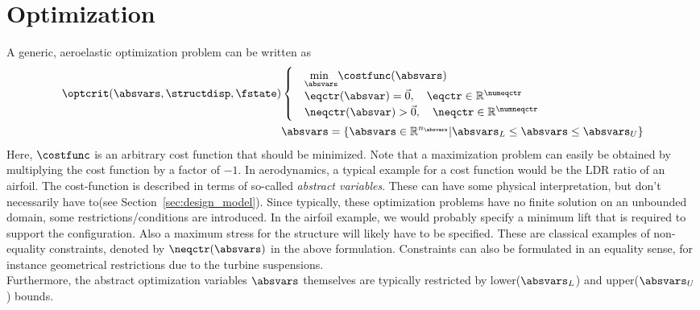 \documentclass[../main.tex]{subfiles}
\begin{document}
\setlength{\delimitershortfall}{0pt}
\section{Optimization}\label{sec:optimization}




A generic, aeroelastic optimization problem can be written as
\begin{align}
\optcrit(\absvars,\structdisp,\fstate)
&\begin{cases}
&\underset{\absvars}{\text{min }}\costfunc(\absvars) \\%
&\eqctr(\absvar)=\vec{0},~~~\eqctr \in \mathbb{R}^{\numeqctr} \\
&\neqctr(\absvar)>\vec{0},~~~\neqctr \in \mathbb{R}^{\numneqctr} \\
\end{cases} \label{eq:generic_optimization_problem_1}\\
&\absvars = \{ \absvars \in \mathbb{R}^{n_{\absvars}} | \absvars_L \leq \absvars \leq \absvars_U \}\label{eq:generic_optimization_problem_2}
\end{align}
Here,  $\costfunc$ is an arbitrary cost function that should be minimized. Note that a maximization problem can easily be obtained by multiplying the cost function by a factor of $-1$. In aerodynamics, a typical example for a cost function would be the \ac{LDR} ratio of an airfoil. The cost-function is described in terms of so-called \textit{abstract variables}. These can have some physical interpretation, but don't necessarily have to(see Section~\ref{sec:design_model}). Since typically, these optimization problems have no finite solution on an unbounded domain, some restrictions/conditions are introduced. In the airfoil example, we would probably specify a minimum lift that is required to support the configuration. Also a maximum stress for the structure will likely have to be specified. These are classical examples of non-equality constraints, denoted by $\neqctr(\absvars)$ in the above formulation. Constraints can also be formulated in an equality sense, for instance geometrical restrictions due to the turbine suspensions.\\
Furthermore, the abstract optimization variables $\absvars$ themselves are typically restricted by lower($\absvars_L$) and upper($\absvars_U$) bounds.\\
\end{document}
